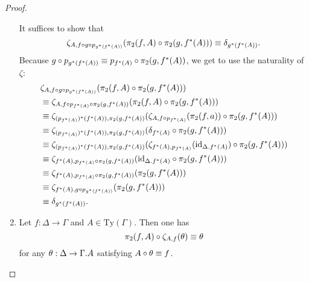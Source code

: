 \begin{proof}
\begin{enumerate}
\medskip
It suffices to show that
\begin{equation*}
\zeta_{A,f\circ g\circ p_{g^\ast(f^\ast(A))}}(\pi_2(f,A)\circ\pi_2(g,f^\ast(A)))\equiv\delta_{g^\ast(f^\ast(A))}.
\end{equation*}
Because $g\circ p_{g^\ast(f^\ast(A))}\equiv p_{f^\ast(A)}\circ\pi_2(g,f^\ast(A))$, we get
to use the naturality of $\zeta$:
\begin{align*}
& \zeta_{A,f\circ g\circ p_{g^\ast(f^\ast(A))}}(\pi_2(f,A)\circ\pi_2(g,f^\ast(A))) \\
& \jdeq
\zeta_{A,f\circ p_{f^\ast(A)}\circ\pi_2(g,f^\ast(A))}(\pi_2(f,A)\circ\pi_2(g,f^\ast(A))) \\
& \jdeq
\zeta_{(p_{f^\ast(A)})^\ast(f^\ast(A)),\pi_2(g,f^\ast(A))}(\zeta_{A,f\circ p_{f^\ast(A)}}(\pi_2(f,a))\circ\pi_2(g,f^\ast(A))) \\
& \jdeq
\zeta_{(p_{f^\ast(A)})^\ast(f^\ast(A)),\pi_2(g,f^\ast(A))}(\delta_{f^\ast(A)}\circ\pi_2(g,f^\ast(A))) \\
& \jdeq
\zeta_{(p_{f^\ast(A)})^\ast(f^\ast(A)),\pi_2(g,f^\ast(A))}(\zeta_{f^\ast(A),p_{f^\ast(A)}}(\catid{\ctxext{\Delta}{f^\ast(A)}})\circ\pi_2(g,f^\ast(A))) \\
& \jdeq
\zeta_{f^\ast(A),p_{f^\ast(A)}\circ\pi_2(g,f^\ast(A))}(\catid{\ctxext{\Delta}{f^\ast(A)}}\circ\pi_2(g,f^\ast(A))) \\
& \jdeq
\zeta_{f^\ast(A),p_{f^\ast(A)}\circ\pi_2(g,f^\ast(A))}(\pi_2(g,f^\ast(A))) \\
& \jdeq
\zeta_{f^\ast(A),g\circ p_{g^\ast(f^\ast(A))}}(\pi_2(g,f^\ast(A)))\\
& \jdeq
\delta_{g^\ast(f^\ast(A))}.
\end{align*}
\item
Let $f:\Delta\to\Gamma$ and $A\in\mathrm{Ty}(\Gamma)$. Then one has 
\begin{equation*}
\pi_2(f,A)\circ\zeta_{A,f}(\theta)\equiv\theta
\end{equation*}
for any $\theta:\Delta\to\ctxext{\Gamma}{A}$ satisfying $A\circ\theta\equiv f$.


\end{enumerate}
\end{proof}
